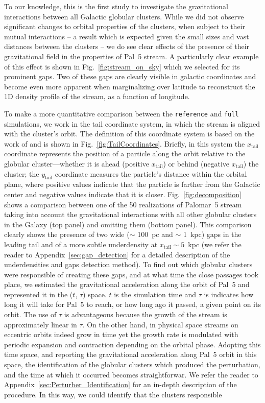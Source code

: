 \documentclass[draft]{aa}
\begin{document}
    To our knowledge, this is the first study to investigate the gravitational interactions between all Galactic globular clusters. While we did not  observe significant changes to orbital properties of the clusters, when subject to their mutual interactions -- a result which is  expected given the small sizes and vast distances between the clusters -- we do see clear effects of the presence of their gravitational field in the properties of Pal~5 stream. A particularly clear example of this effect is shown in Fig.~\ref{fig:stream_on_sky} which we selected for its prominent gaps. Two of these gaps are clearly visible in galactic coordinates and become even more apparent when marginalizing over latitude to reconstruct the 1D density profile of the stream, as a function of longitude.

    To make a more quantitative comparison between the \texttt{reference} and \texttt{full} simulations, we work in the tail coordinate system, in which  the stream is aligned with the cluster's orbit. The definition of this coordinate system is based on the work of \citet{2004AJ....127.2753D} and is shown in Fig.~\ref{fig:TailCoordinates}. Briefly, in this system the $x_{\textrm{tail}}$ coordinate represents the position of a particle along the orbit relative to the globular cluster—whether it is ahead (positive $x_{\textrm{tail}}$) or behind (negative $x_{\textrm{tail}}$) the cluster;  the $y_{\textrm{tail}}$ coordinate measures the particle's distance within the orbital plane, where positive values indicate that the particle is farther from the Galactic center and negative values indicate that it is closer. Fig.~\ref{fig:decomposition} shows a comparison between one of the 50 realizations of Palomar~5 stream taking into account the gravitational interactions with all other globular clusters in the Galaxy (top panel) and omitting them (bottom panel). This comparison clearly shows the presence of two wide ($\sim$ 100~pc and $\sim$ 1~kpc) gaps in the leading tail and of a more subtle underdensity at $x_{\textrm{tail}}\sim 5$~kpc (we refer the reader to Appendix~\ref{sec:gap_detection} for a detailed description of the underdensities and gaps detection method). To find out which globular clusters were responsible of creating these gaps, and at what time the close passages took place, we estimated the gravitational acceleration along the orbit of Pal~5 and represented it in the ($t$, $\tau$) space. $t$ is the simulation time and $\tau$ is indicates how long it will take for Pal~5 to reach, or how  long ago it passed, a given point on its orbit. The use of $\tau$ is advantageous because the growth of the stream is approximately linear in $\tau$. On the other hand, in physical space streams on eccentric orbits indeed grow in time yet the growth rate is modulated with periodic expansion and contraction depending on the orbital phase. Adopting this time space, and reporting the gravitational acceleration along Pal~5 orbit in this space, the identification of the globular clusters which produced the perturbation, and the time at which it occurred becomes straightforwar. We refer the reader to Appendix~\ref{sec:Perturber_Identification} for an in-depth description of the procedure. In this way, we could identify that the clusters responsible 
\end{document}
